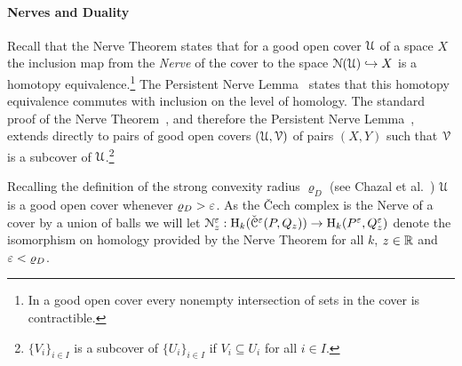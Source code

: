 \paragraph*{Nerves and Duality}

Recall that the Nerve Theorem states that for a good open cover $\mathcal{U}$ of a space $X$ the inclusion map from the \emph{Nerve} of the cover to the space $\mathcal{N}(\mathcal{U})\hookrightarrow X$ is a homotopy equivalence.\footnote{In a good open cover every nonempty intersection of sets in the cover is contractible.}
The Persistent Nerve Lemma~\cite{chazal08towards} states that this homotopy equivalence commutes with inclusion on the level of homology.
The standard proof of the Nerve Theorem~\cite{kozlov07combinatorial}, and therefore the Persistent Nerve Lemma~\cite{chazal08towards}, extends directly to pairs of good open covers $(\mathcal{U}, \mathcal{V})$ of pairs $(X, Y)$ such that $\mathcal{V}$ is a subcover of $\mathcal{U}$.\footnote{$\{V_i\}_{i\in I}$ is a subcover of $\{U_i\}_{i\in I}$ if $V_i\subseteq U_i$ for all $i\in I$.}

Recalling the definition of the strong convexity radius $\varrho_D$ (see Chazal et al.~\cite{chazal09analysis}) $\mathcal{U}$ is a good open cover whenever $\varrho_D > \varepsilon$.
As the \v Cech complex is the Nerve of a cover by a union of balls we will let $\mathcal{N}_z^\varepsilon : \mathrm{H}_k(\check{\mathcal{C}}^\varepsilon(P,Q_z))\to \mathrm{H}_k(P^\varepsilon, Q_z^\varepsilon)$ denote the isomorphism on homology provided by the Nerve Theorem for all $k$, $z\in\mathbb{R}$ and $\varepsilon < \varrho_D$.

